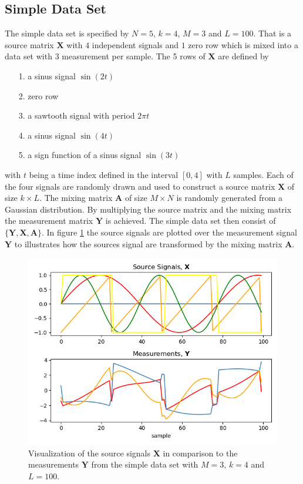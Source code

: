 \subsection{Simple Data Set}
The simple data set is specified by $N = 5$, $k=4$, $M = 3$ and $L = 100$. That is a source matrix $\textbf{X}$ with $4$ independent signals and $1$ zero row which is mixed into a data set with $3$ measurement per sample.       
The 5 rows of $\textbf{X}$ are defined by 
\begin{itemize}
\item[1.] a sinus signal $\sin(2t)$
\item[2.] zero row
\item[3.] a sawtooth signal with period $2 \pi t$
\item[4.] a sinus signal $\sin(4t)$
\item[5.] a sign function of a sinus signal $\sin(3t)$
\end{itemize}
with $t$ being a time index defined in the interval $[0,4]$ with $L$ samples. Each of the four signals are randomly drawn and used to construct a source matrix $\mathbf{X}$ of size $k \times L$.
The mixing matrix $\mathbf{A}$ of size $M \times N$ is randomly generated from a Gaussian distribution. 
By multiplying the source matrix and the mixing matrix the measurement matrix $\mathbf{Y}$ is achieved.
The simple data set then consist of $\{ \mathbf{Y}, \mathbf{X}, \mathbf{A} \}$.
In figure \ref{fig:simple} the source signals are plotted over the measurement signal $\mathbf{Y}$ to illustrates how the sources signal are transformed by the mixing matrix $\textbf{A}$.
\begin{figure}[H]
\centering
\includegraphics[scale=0.5]{figures/ch_6/simple_data.png}
\caption{Visualization of the source signals $\textbf{X}$ in comparison to the measurements $\mathbf{Y}$ from the simple data set with $M = 3$, $k=4$ and $L=100$.}
\label{fig:simple}
\end{figure}
\noindent

